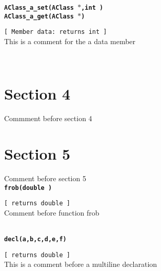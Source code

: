 {\tt \bf AClass\_a\_set(AClass $*$,int )\\
AClass\_a\_get(AClass $*$) }
\\
\makebox[0.5in]{}\begin{minipage}[t]{6in}
{\tt [ Member data: returns int  ]  }\\
   This is a comment for the a data member   
\\

\end{minipage}\\

\section{Section 4}   Commment before section 4   
\\\section{Section 5}   Comment before section 5   
\\{\tt \bf frob(double ) }
\\
\makebox[0.5in]{}\begin{minipage}[t]{6in}
{\tt [ returns double  ]  }\\
   Comment before function frob   
\\

\end{minipage}\\

{\tt \bf decl(a,b,c,d,e,f) }
\\
\makebox[0.5in]{}\begin{minipage}[t]{6in}
{\tt [ returns double  ]  }\\
   This is a comment before a multiline declaration   
\\

\end{minipage}\\



